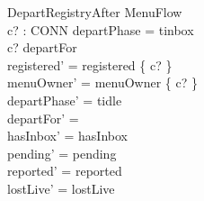 \documentclass[a4paper,10pt,fleqn]{article}
\begin{document}
\begin{schema}{DepartRegistryAfter}
  \Delta MenuFlow \\
  c? : CONN
\where
  departPhase = tinbox \\
  c? \in departFor \\
  registered' = registered \setminus \{ c? \} \\
  menuOwner' = menuOwner \setminus \{ c? \} \\
  departPhase' = tidle \\
  departFor' = \emptyset \\
  hasInbox' = hasInbox \\
  pending' = pending \\
  reported' = reported \\
  lostLive' = lostLive
\end{schema}
\end{document}
